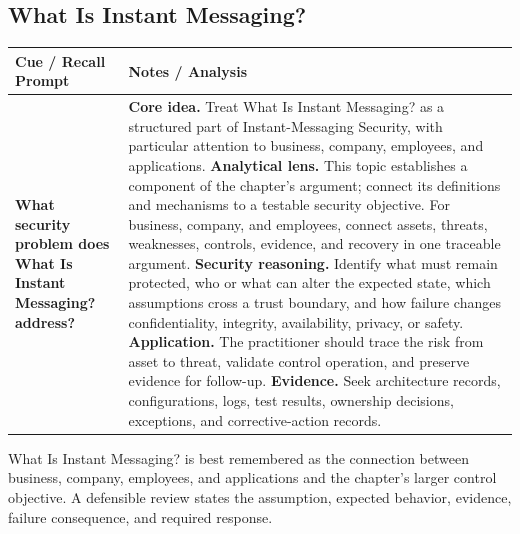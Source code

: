 \documentclass[11pt]{article}
\newcommand{\CornellHeader}{%
\rowcolor{Navy}\color{white}\bfseries Cue / Recall Prompt & \color{white}\bfseries Notes / Analysis\\\hline}
\newcommand{\CornellRow}[2]{%
\cellcolor{CueGray}\RaggedRight\textbf{#1} & \RaggedRight #2\\\hline}
\begin{document}
\subsection*{What Is Instant Messaging?}
\begin{longtable}{>{\RaggedRight\arraybackslash}p{}|>{\RaggedRight\arraybackslash}p{}}
\CornellHeader
\CornellRow{What security problem does What Is Instant Messaging? address?}{\textbf{Core idea.} Treat What Is Instant Messaging? as a structured part of Instant-Messaging Security, with particular attention to business, company, employees, and applications. \textbf{Analytical lens.} This topic establishes a component of the chapter's argument; connect its definitions and mechanisms to a testable security objective. For business, company, and employees, connect assets, threats, weaknesses, controls, evidence, and recovery in one traceable argument. \textbf{Security reasoning.} Identify what must remain protected, who or what can alter the expected state, which assumptions cross a trust boundary, and how failure changes confidentiality, integrity, availability, privacy, or safety. \textbf{Application.} The practitioner should trace the risk from asset to threat, validate control operation, and preserve evidence for follow-up. \textbf{Evidence.} Seek architecture records, configurations, logs, test results, ownership decisions, exceptions, and corrective-action records.}
\end{longtable}
\begin{topicsummary}
What Is Instant Messaging? is best remembered as the connection between business, company, employees, and applications and the chapter's larger control objective. A defensible review states the assumption, expected behavior, evidence, failure consequence, and required response.
\end{topicsummary}
\end{document}
